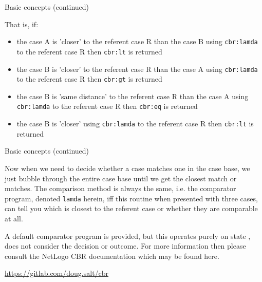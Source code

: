 \documentclass[usenames,dvipsnames,10pt]{beamer} %
\begin{document}
\begin{frame}{Basic concepts (continued)}

    That is, if: 

    \begin{itemize}
        \item the case A is 'closer' to the referent case R than the case B
            using {\color{blue}\texttt{cbr:lamda}}  to the referent case R then
            {\color{blue}\texttt{cbr:lt}} is returned
        \item the case B is 'closer' to the referent case R than the case A
            using {\color{blue}\texttt{cbr:lamda}}  to the referent case R then
            {\color{blue}\texttt{cbr:gt}} is returned
        \item the case B is 'same distance' to the referent case R than the
            case A using {\color{blue}\texttt{cbr:lamda}}  to the referent case
            R then {\color{blue}\texttt{cbr:eq}} is returned
        \item the case B is 'closer' using {\color{blue}\texttt{cbr:lamda}}  to
            the referent case R then {\color{blue}\texttt{cbr:lt}} is returned
    \end{itemize}

\end{frame}

\begin{frame}{Basic concepts (continued)}

    Now when we need to decide whether a case matches one in the case base, we
    just bubble through the entire case base until we get the closest match or
    matches. The comparison method is always the same, i.e. the comparator
    program, denoted {\color{blue}\texttt{lamda}} herein, iff this routine when
    presented with three cases, can tell you which is closest to the referent
    case or whether they are comparable at all.

    \vspace{0.25cm}
    A default comparator program is provided, but this operates purely on state
    , does not consider the decision or outcome. For more information then
    please consult the NetLogo CBR documentation which may be found here.

    \vspace{0.25cm}
    \url{https://gitlab.com/doug.salt/cbr}


\end{frame}
\end{document}
